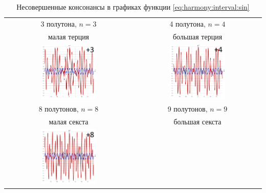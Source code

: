\begin{table}[!ht]
    \caption{Несовершенные консонансы в графиках функции \ref{eq:harmony:interval:sin}}
    \label{t:harmony:interval:conso-3-4-8-9}
    \centering
    \begin{tabular}{c|c}
        \hline\hline
        3 полутона, $n=3$   & 4 полутона, $n=4$ \\
        малая терция        & большая терция \\
        \includegraphics[width=0.45\textwidth]{fig/intervals/i03}
            & \includegraphics[width=0.45\textwidth]{fig/intervals/i04} \\
        \hline\hline
        8 полутонов, $n=8$  & 9 полутонов, $n=9$ \\
        малая секста        & большая секста \\
        \includegraphics[width=0.45\textwidth]{fig/intervals/i08}

\end{tabular}
\end{table}
